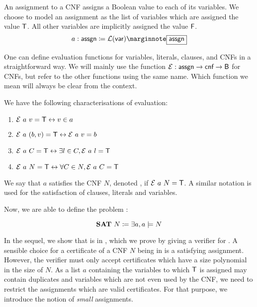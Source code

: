 An assignment to a CNF assigns a Boolean value to each of its variables. We choose to model an assignment as the list of variables which are assigned the value $\mathsf{T}$. All other variables are implicitly assigned the value $\mathsf{F}$.
\[a : \assgn \defeq \listsof{\bvar}\mnote{\assgn} \]

One can define evaluation functions \mnotec{$\eval$} for variables, literals, clauses, and CNFs in a straightforward way. 
We will mainly use the function $\mathcal{E} : \textsf{assgn} \rightarrow \textsf{cnf} \rightarrow \textsf{B}$ for CNFs, but refer to the other functions using the same name. 
Which function we mean will always be clear from the context. 

We have the following characterisations of evaluation:
\begin{lemma}\leavevmode
  \begin{enumerate}
    \item $\mathcal{E}~a~v = \mathsf{T} \leftrightarrow v \in a$
    \item $\mathcal{E}~a~(b, v) = \mathsf{T} \leftrightarrow \mathcal{E}~a~v = b$
    \item $\mathcal{E}~a~C = \mathsf{T} \leftrightarrow \exists l \in C, \mathcal{E}~a~l = \mathsf{T}$
    \item $\mathcal{E}~a~N = \mathsf{T} \leftrightarrow \forall C \in N, \mathcal{E}~a~C = \mathsf{T}$
  \end{enumerate}
\end{lemma}

We say that $a$ satisfies the CNF $N$, denoted , if $\mathcal{E}~a~N = \mathsf{T}$. 
A similar notation is used for the satisfaction of clauses, literals and variables.

Now, we are able to define the problem \SAT{}:
\begin{definition}
  \[\textbf{SAT}{}~N \coloneqq \exists a, a \models N \]
\end{definition}

In the sequel, we show that \SAT{} is in \NP{}, which we prove by giving a verifier for \SAT{}. A sensible choice for a certificate of a CNF $N$ being in \SAT{} is a satisfying assignment. However, the verifier must only accept certificates which have a size polynomial in the size of $N$. 
As a list $a$ containing the variables to which $\mathsf{T}$ is assigned may contain duplicates and variables which are not even used by the CNF, we need to restrict the assignments which are valid certificates.
For that purpose, we introduce the notion of \emph{small} assignments. 

